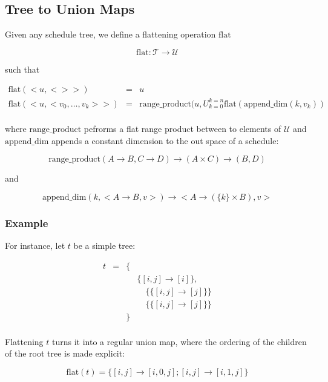\documentclass{article}
\begin{document}
\subsection{Tree to Union Maps}

Given any schedule tree, we define a flattening operation $\text{flat}$

\[
    \text{flat}: \mathcal{T} \rightarrow \mathcal{U}
\]

\noindent such that

\[
    \begin{array}{lcl}
        \text{flat}(<u, <> >) &=& u \\
        \text{flat}(<u, <v_0, \ldots, v_k> >) &=& \text{range\_product}(u, U_{k=0}^{k=n} \text{flat}(\text{append\_dim}(k, v_k)) \\
    \end{array}
\]

\noindent where $\text{range\_product}$ pefrorms a flat range product between to elements of $\mathcal{U}$ and $\text{append\_dim}$ appends a constant dimension to the out space of a schedule:

\[
    \text{range\_product}(A \rightarrow B, C \rightarrow D) \rightarrow (A \times C) \rightarrow (B, D)
\]

\noindent and

\[
    \text{append\_dim}(k, <A \rightarrow B, v>) \rightarrow < A \rightarrow (\{k\} \times B), v >
\]

\subsubsection*{Example}

For instance, let $t$ be a simple tree:

\[
    \begin{array}{lcll}
        t &=& \{ &\\
          & &    & \{[i,j] \rightarrow [i] \},\\
          & &    & \quad\{ \{ [i,j] \rightarrow [j] \} \}\\
          & &    & \quad\{ \{ [i,j] \rightarrow [j] \} \}\\
          & & \} &\\
    \end{array}
\]

Flattening $t$ turns it into a regular union map, where the ordering of the children of the root tree is made explicit:

\[
    \text{flat}(t) = \{ [i,j] \rightarrow [i,0,j] ; [i,j] \rightarrow [i,1,j] \}
\]
\end{document}
